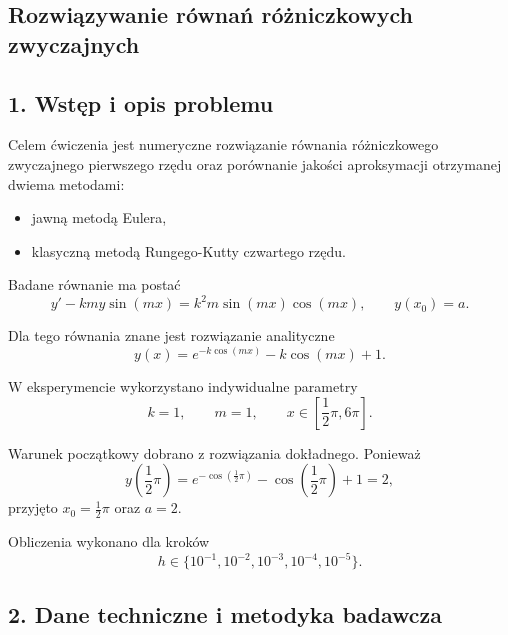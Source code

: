 \documentclass[12pt,a4paper]{article}
\begin{document}
\begin{center}
    \section*{Rozwiązywanie równań różniczkowych zwyczajnych}
\end{center}

\subsection*{1. Wstęp i opis problemu}

Celem ćwiczenia jest numeryczne rozwiązanie równania różniczkowego zwyczajnego pierwszego rzędu oraz porównanie jakości aproksymacji otrzymanej dwiema metodami:
\begin{itemize}
    \item jawną metodą Eulera,
    \item klasyczną metodą Rungego-Kutty czwartego rzędu.
\end{itemize}

Badane równanie ma postać
\begin{equation}
    y' - k m y \sin(mx) = k^2 m \sin(mx)\cos(mx), \qquad y(x_0)=a.
    \label{eq:ode}
\end{equation}

Dla tego równania znane jest rozwiązanie analityczne
\begin{equation}
    y(x) = e^{-k\cos(mx)} - k\cos(mx) + 1.
    \label{eq:exact}
\end{equation}

W eksperymencie wykorzystano indywidualne parametry
\begin{equation}
    k=1, \qquad m=1, \qquad x \in \left[\frac{1}{2}\pi, 6\pi\right].
\end{equation}

Warunek początkowy dobrano z rozwiązania dokładnego. Ponieważ
\begin{equation}
    y\left(\frac{1}{2}\pi\right)
    = e^{-\cos(\frac{1}{2}\pi)} - \cos\left(\frac{1}{2}\pi\right) + 1
    = 2,
\end{equation}
przyjęto $x_0=\frac{1}{2}\pi$ oraz $a=2$.

Obliczenia wykonano dla kroków
\begin{equation}
    h \in \{10^{-1}, 10^{-2}, 10^{-3}, 10^{-4}, 10^{-5}\}.
\end{equation}

\subsection*{2. Dane techniczne i metodyka badawcza}
\end{document}
